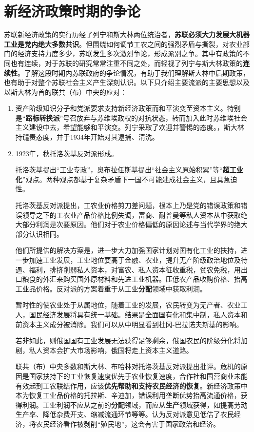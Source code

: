 \section{新经济政策时期的争论}

苏联新经济政策的实行历经了列宁和斯大林两位统治者，\textbf{苏联必须大力发展大机器工业是党内绝大多数共识}。但围绕如何调节工农之间的强烈矛盾与撕裂，对农业部门的经济支持力度多少，苏联发生多次激烈争论，形成派别之争。其中有政策的不同也有连续，对于苏联的研究常常注重不同之处，而轻视了列宁与斯大林政策的\textbf{连续性}。了解这段时期内苏联政府的争论情况，有助于我们理解斯大林中后期政策，也有助于对整个苏联社会主义产生深刻认识。以下只介绍主要流派的主要思想以及以斯大林为首的联共（布）中央的应对：
\begin{enumerate}
\item 资产阶级知识分子和党派要求支持新经济政策而和平演变至资本主义。特别是“\textbf{路标转换派}”号召放弃与苏维埃政权的对抗状态，转而加入此时苏维埃社会主义建设中去，希望能够和平演变。列宁采取了欢迎并警惕的态度。，斯大林持谴责态度，并于1934年开始对其逮捕、清洗。\cite{wenyilubiao}

\item 1923年，秋托洛茨基反对派形成。

  托洛茨基提出“工业专政”，奥布拉任斯基提出“社会主义原始积累”等“\textbf{超工业化}”观点。两种观点都基于复杂矛盾下一国不可能建成社会主义，且具急迫性。

  托洛茨基反对派提出，工农业价格剪刀差问题，根本上乃是党的错误政策和错误领导之下的工农业产品价格比例失调，富商、耐普曼等私人资本从中获取绝大部分利润是次要原因。他们对于农业价格偏低的原因论述与当代学界的绝大部分认识相同。

  他们所提供的解决方案是，进一步大力加强国家计划对国有化工业的扶持，进一步加速工业发展，工业地位要高于金融、农业，提升无产阶级政治地位及待遇、福利，排挤削弱私人资本，对富农、私人资本征收重税，贫农免税，用出口粮食的外汇来购买国外原材料和先进工业机器。压低农产品收购价格、抬高工业品价格。反对派的方案着重于从工业\textbf{分配}领域中获取利润。

  暂时性的使农业处于从属地位，随着工业的发展，农民转变为无产者、农业工人，国民经济发展将具有统一基础。结果是全面国有化和集中制，私人资本和前资本主义成分被消除。我们可以从中明显看到杜冈-巴拉诺夫斯基的影响。

  若非如此，则俄国国有工业发展无法获得足够剩余，俄国农民的阶级分化将加剧，私人资本会扩大市场影响，俄国将走上资本主义道路。

  联共（布）中央多数和斯大林、布哈林对托洛茨基反对派提出批评。危机的原因是国家扶持下的工业恢复速度优先于农业恢复速度，合作社和国营商业未能有效起到工农联结作用，应该\textbf{优先帮助和支持农民经济的恢复}。新经济政策中本为恢复工业品价格的托拉斯、辛迪加，错误利用垄断优势抬高流通价格，获得利润。工业利润不应从之前的\textbf{分配}领域，而应从\textbf{生产}领域获得，如提高劳动生产率、降低杂费开支、缩减流通环节等等。认为反对派意见低估了农民经济，将农民经济看作被剥削“殖民地”，这会有害于国家政治和经济。


\end{enumerate}
